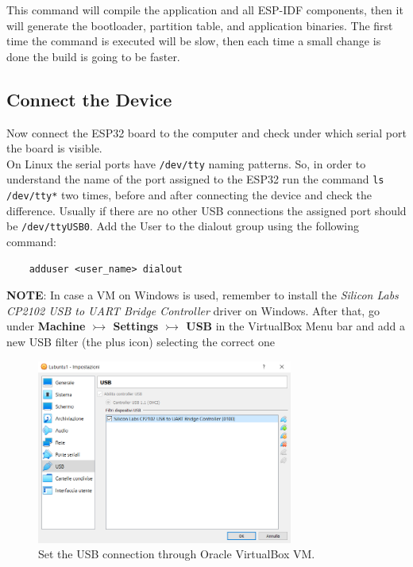 This command will compile the application and all ESP-IDF components, then it will generate the bootloader, partition table, and application binaries. 
The first time the command is executed will be slow, then each time a small change is done the build is going to be faster.

\subsection{Connect the Device}
Now connect the ESP32 board to the computer and check under which serial port the board is visible.
\\On Linux the serial ports have \texttt{/dev/tty} naming patterns. So, in order to understand the name of the port assigned to the ESP32
run the command \texttt{ls /dev/tty*} two times, before and after connecting the device and check the difference.
Usually if there are no other USB connections the assigned port should be \texttt{/dev/ttyUSB0}.
Add the User to the dialout group using the following command:
\begin{lstlisting}
    adduser <user_name> dialout
\end{lstlisting} 

\textbf{NOTE}: In case a VM on Windows is used, remember to install the \textit{Silicon Labs CP2102 USB to UART Bridge Controller} driver
on Windows. After that, go under \textbf{Machine $\rightarrowtail$ Settings $\rightarrowtail$ USB} in the VirtualBox Menu bar and add a new USB filter (the plus icon) selecting the correct one

\begin{figure}[H]
    \vspace{0.4cm}
    \centering
    \includegraphics[width=0.75\textwidth]{images/USBex.PNG}
    \caption{Set the USB connection through Oracle VirtualBox VM.}
    \label{fig:USBex} %
\end{figure}


